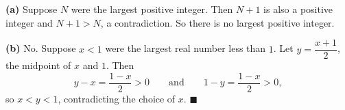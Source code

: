 \textbf{(a)} Suppose $N$ were the largest positive integer. Then $N+1$ is also a positive integer and $N+1>N$, a contradiction. So there is no largest positive integer.

\textbf{(b)} No. Suppose $x<1$ were the largest real number less than $1$. Let $y=\dfrac{x+1}{2}$, the midpoint of $x$ and $1$. Then
\[y-x=\dfrac{1-x}{2}>0\qquad\text{and}\qquad 1-y=\dfrac{1-x}{2}>0,\]
so $x<y<1$, contradicting the choice of $x$. $\blacksquare$
